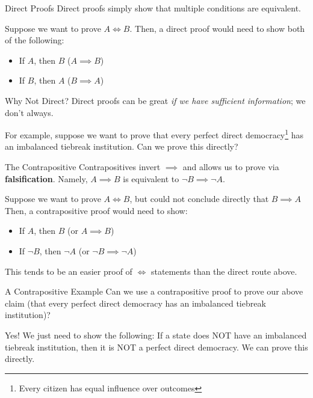 \documentclass[10pt]{beamer}
\begin{document}
\begin{frame}{Direct Proofs}
    Direct proofs simply show that multiple conditions are equivalent.

    Suppose we want to prove $A \iff B$. Then, a direct proof would need to show both of the following:

    \begin{itemize}
        \item If $A$, then $B$ ($A \implies B$)
        \item If $B$, then $A$ ($B \implies A$)
    \end{itemize}
\end{frame}

\begin{frame}{Why Not Direct?}
    Direct proofs can be great \emph{if we have sufficient information}; we don't always.

    For example, suppose we want to prove that every perfect direct democracy\footnote{Every citizen has equal influence over outcomes} has an imbalanced tiebreak institution. Can we prove this directly?

\end{frame}

\begin{frame}{The Contrapositive}
    Contrapositives invert $\implies$ and allows us to prove via \textbf{falsification}. Namely, $A \implies B$ is equivalent to $\neg B \implies \neg A$.

    Suppose we want to prove $A \iff B$, but could not conclude directly that $B \implies A$ Then, a contrapositive proof would need to show:

    \begin{itemize}
        \item If $A$, then $B$ (or $A \implies B$)
        \item If $\neg B$, then $\neg A$ (or $\neg B \implies \neg A$)
    \end{itemize}

    This tends to be an easier proof of $\iff$ statements than the direct route above.
\end{frame}

\begin{frame}{A Contrapositive Example}
    Can we use a contrapositive proof to prove our above claim (that every perfect direct democracy has an imbalanced tiebreak institution)?
    \pause

    Yes! We just need to show the following: If a state does NOT have an imbalanced tiebreak institution, then it is NOT a perfect direct democracy. We can prove this directly.
\end{frame}
\end{document}
